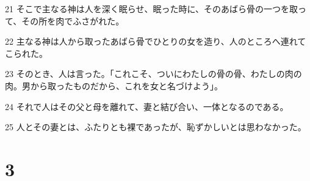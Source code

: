 \par 21 そこで主なる神は人を深く眠らせ、眠った時に、そのあばら骨の一つを取って、その所を肉でふさがれた。
\par 22 主なる神は人から取ったあばら骨でひとりの女を造り、人のところへ連れてこられた。
\par 23 そのとき、人は言った。「これこそ、ついにわたしの骨の骨、わたしの肉の肉。男から取ったものだから、これを女と名づけよう」。
\par 24 それで人はその父と母を離れて、妻と結び合い、一体となるのである。
\par 25 人とその妻とは、ふたりとも裸であったが、恥ずかしいとは思わなかった。

\chapter{3}

